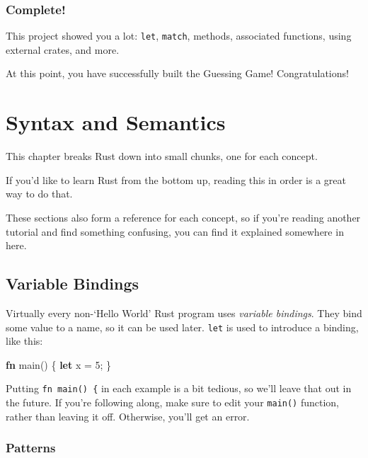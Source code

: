 \documentclass[a4paper,]{book}
\newenvironment{Shaded}{\begin{snugshade}}{\end{snugshade}}
\newcommand{\KeywordTok}[1]{\textcolor[rgb]{0.13,0.29,0.53}{\textbf{{#1}}}}
\newcommand{\DecValTok}[1]{\textcolor[rgb]{0.00,0.00,0.81}{{#1}}}
\newcommand{\NormalTok}[1]{{#1}}
\begin{document}
\subsection{Complete!}\label{complete}

This project showed you a lot: \texttt{let}, \texttt{match}, methods,
associated functions, using external crates, and more.

At this point, you have successfully built the Guessing Game!
Congratulations!

\hypertarget{sec--syntax-and-semantics}{\chapter{Syntax and
Semantics}\label{sec--syntax-and-semantics}}

This chapter breaks Rust down into small chunks, one for each concept.

If you'd like to learn Rust from the bottom up, reading this in order is
a great way to do that.

These sections also form a reference for each concept, so if you're
reading another tutorial and find something confusing, you can find it
explained somewhere in here.

\hypertarget{sec--variable-bindings}{\section{Variable
Bindings}\label{sec--variable-bindings}}

Virtually every non-`Hello World' Rust program uses \emph{variable
bindings}. They bind some value to a name, so it can be used later.
\texttt{let} is used to introduce a binding, like this:

\begin{Shaded}
\begin{Highlighting}[]
\KeywordTok{fn} \NormalTok{main() \{}
    \KeywordTok{let} \NormalTok{x = }\DecValTok{5}\NormalTok{;}
\NormalTok{\}}
\end{Highlighting}
\end{Shaded}

Putting \texttt{fn\ main()\ \{} in each example is a bit tedious, so
we'll leave that out in the future. If you're following along, make sure
to edit your \texttt{main()} function, rather than leaving it off.
Otherwise, you'll get an error.

\subsection{Patterns}\label{patterns}
\end{document}
